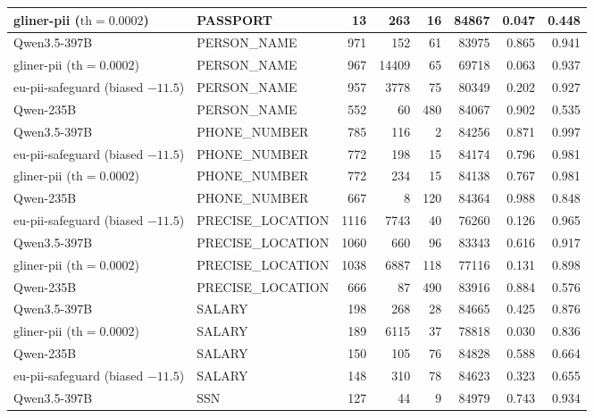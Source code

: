 \documentclass[11pt,a4paper]{article}
\begin{document}
{\begin{longtable}{llrrrrrr}
gliner-pii ($\text{th}=0.0002$)   & PASSPORT          &   13 &   263 &  16 & 84867 & 0.047 & 0.448 \\
\midrule
Qwen3.5-397B                      & PERSON\_NAME      &  971 &   152 &  61 & 83975 & 0.865 & 0.941 \\
gliner-pii ($\text{th}=0.0002$)   & PERSON\_NAME      &  967 & 14409 &  65 & 69718 & 0.063 & 0.937 \\
eu-pii-safeguard (biased $-11.5$) & PERSON\_NAME      &  957 &  3778 &  75 & 80349 & 0.202 & 0.927 \\
Qwen-235B                         & PERSON\_NAME      &  552 &    60 & 480 & 84067 & 0.902 & 0.535 \\
\midrule
Qwen3.5-397B                      & PHONE\_NUMBER     &  785 &   116 &   2 & 84256 & 0.871 & 0.997 \\
eu-pii-safeguard (biased $-11.5$) & PHONE\_NUMBER     &  772 &   198 &  15 & 84174 & 0.796 & 0.981 \\
gliner-pii ($\text{th}=0.0002$)   & PHONE\_NUMBER     &  772 &   234 &  15 & 84138 & 0.767 & 0.981 \\
Qwen-235B                         & PHONE\_NUMBER     &  667 &     8 & 120 & 84364 & 0.988 & 0.848 \\
\midrule
eu-pii-safeguard (biased $-11.5$) & PRECISE\_LOCATION & 1116 &  7743 &  40 & 76260 & 0.126 & 0.965 \\
Qwen3.5-397B                      & PRECISE\_LOCATION & 1060 &   660 &  96 & 83343 & 0.616 & 0.917 \\
gliner-pii ($\text{th}=0.0002$)   & PRECISE\_LOCATION & 1038 &  6887 & 118 & 77116 & 0.131 & 0.898 \\
Qwen-235B                         & PRECISE\_LOCATION &  666 &    87 & 490 & 83916 & 0.884 & 0.576 \\
\midrule
Qwen3.5-397B                      & SALARY            &  198 &   268 &  28 & 84665 & 0.425 & 0.876 \\
gliner-pii ($\text{th}=0.0002$)   & SALARY            &  189 &  6115 &  37 & 78818 & 0.030 & 0.836 \\
Qwen-235B                         & SALARY            &  150 &   105 &  76 & 84828 & 0.588 & 0.664 \\
eu-pii-safeguard (biased $-11.5$) & SALARY            &  148 &   310 &  78 & 84623 & 0.323 & 0.655 \\
\midrule
Qwen3.5-397B                      & SSN               &  127 &    44 &   9 & 84979 & 0.743 & 0.934 \\

\end{longtable}}
\end{document}
